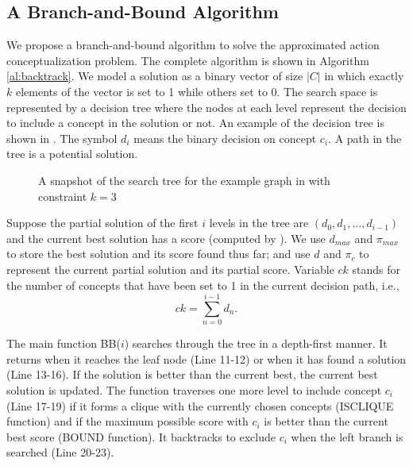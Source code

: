 \subsection{A Branch-and-Bound Algorithm}
We propose a branch-and-bound algorithm to solve the approximated
action conceptualization problem.
The complete algorithm is shown in Algorithm \ref{al:backtrack}.
We model a solution as a binary vector of size $|C|$ in which exactly
$k$ elements of the vector is set to 1 while others set to 0.
The search space is represented by a decision tree
where the nodes at each level represent the decision to include a concept in
the solution or not. An example of the decision tree
is shown in . The symbol $d_i$
means the binary decision on concept $c_i$. A path in
the tree is a potential solution.

\begin{figure}[th]
\centering
{}
\caption{A snapshot of the search tree for the
example graph in  with constraint $k=3$}
\label{fig:search_tree}
\end{figure}

Suppose the partial solution of the first $i$ levels in the tree
are $(d_0, d_1, ..., d_{i-1})$ and
the current best solution has a score (computed by ).
We use $d_{max}$ and $\pi_{max}$ to store the
best solution and its score found thus far; and use $d$ and $\pi_{c}$ to
represent the current partial solution and its partial score.
Variable $ck$ stands for the number of concepts that have been set to
1 in the current decision path, i.e.,
\[ck=\sum_{n=0}^{i-1}d_n.\]

The main function BB($i$) searches through the tree in a depth-first manner.
It returns when it reaches the leaf node (Line 11-12) or when it has found a
solution (Line 13-16). If the solution is better than the current best,
the current best solution is updated. The function traverses one
more level to include concept $c_i$ (Line 17-19) if it forms
a clique with the currently chosen concepts (ISCLIQUE function)
and if the maximum possible score with $c_i$ is better than
the current best score (BOUND function). It backtracks to exclude $c_i$
when the left branch is searched (Line 20-23).

